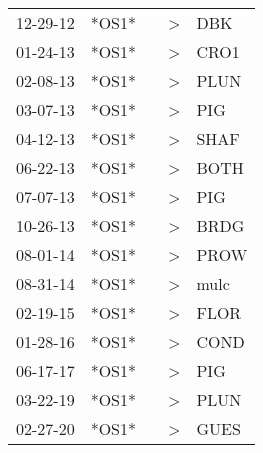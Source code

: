 \begin{supertabular}{p{0.07\textwidth}p{0.06\textwidth}p{0.02\textwidth}p{0.02\textwidth}p{0.06\textwidth}}
 12-29-12\textsuperscript{} &  *OS1* &   &  \textgreater &   DBK\textsuperscript{} \\
 01-24-13\textsuperscript{} &  *OS1* &   &  \textgreater &  CRO1\textsuperscript{} \\
 02-08-13\textsuperscript{} &  *OS1* &   &  \textgreater &  PLUN\textsuperscript{} \\
 03-07-13\textsuperscript{} &  *OS1* &   &  \textgreater &   PIG\textsuperscript{} \\
 04-12-13\textsuperscript{} &  *OS1* &   &  \textgreater &  SHAF\textsuperscript{} \\
 06-22-13\textsuperscript{} &  *OS1* &   &  \textgreater &  BOTH\textsuperscript{} \\
 07-07-13\textsuperscript{} &  *OS1* &   &  \textgreater &   PIG\textsuperscript{} \\
 10-26-13\textsuperscript{} &  *OS1* &   &  \textgreater &  BRDG\textsuperscript{} \\
 08-01-14\textsuperscript{} &  *OS1* &   &  \textgreater &  PROW\textsuperscript{} \\
 08-31-14\textsuperscript{} &  *OS1* &   &  \textgreater &  mulc\textsuperscript{} \\
 02-19-15\textsuperscript{} &  *OS1* &   &  \textgreater &  FLOR\textsuperscript{} \\
 01-28-16\textsuperscript{} &  *OS1* &   &  \textgreater &  COND\textsuperscript{} \\
 06-17-17\textsuperscript{} &  *OS1* &   &  \textgreater &   PIG\textsuperscript{} \\
 03-22-19\textsuperscript{} &  *OS1* &   &  \textgreater &  PLUN\textsuperscript{} \\
 02-27-20\textsuperscript{} &  *OS1* &   &  \textgreater &  GUES\textsuperscript{} \\
\end{supertabular}
